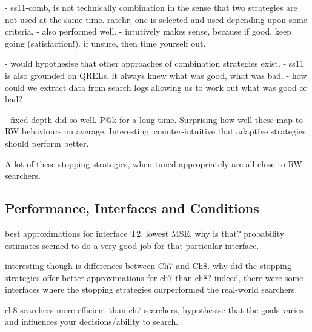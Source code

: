     - ss11-comb, is not technically combination in the sense that two strategies are not used at the same time. ratehr, one is selected and used depending upon some criteria.
        - also performed well.
        - intutively makes sense, because if good, keep going (satisfaction!). if unsure, then time yourself out.
    
    - would hypothesise that other approaches of combination strategies exist.
        - ss11 is also grounded on QRELs. it always knew what was good, what was bad.
            - how could we extract data from search logs allowing us to work out what was good or bad?

- fixed depth did so well. P@k for a long time. Surprising how well these map to RW behaviours on average. Interesting, counter-intuitive that adaptive strategies should perform better.

 A lot of these stopping strategies, when tuned appropriately are all close to RW searchers. 

\subsection{Performance, Interfaces and Conditions}

best approximations for interface T2.
lowest MSE. why is that? probability estimates seemed to do a very good job for that particular interface.

interesting though is differences between Ch7 and Ch8.
why did the stopping strategies offer better approximations for ch7 than ch8? indeed, there were some interfaces where the stopping strategies ourperformed the real-world searchers.

ch8 searchers more efficient than ch7 searchers, hypothesise that the goals varies and influences your decisions/ability to search.

